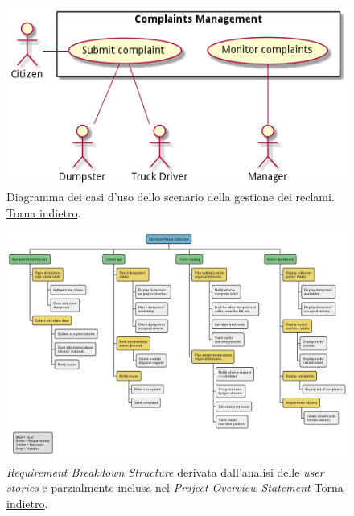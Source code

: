 \begin{figure}[H]
    \centering
    \includegraphics[width=\textwidth]{uml/complaints-use-cases.pm}
    \caption{Diagramma dei casi d'uso dello scenario della gestione dei reclami. \hyperlink{back:uml/complaints-use-cases}{Torna indietro}.}
    \label{fig:uml/complaints-use-cases}
\end{figure}


\begin{figure}[H]
    \centering
    \includegraphics[width=\textwidth]{uml/requirement-breakdown-structure.pm}
    \caption{\textit{Requirement Breakdown Structure} derivata dall'analisi delle \textit{user stories} e parzialmente inclusa nel \textit{Project Overview Statement}   \hyperlink{back:uml/requirement-breakdown-structure}{Torna indietro}.}
    \label{fig:uml/requirement-breakdown-structure}
\end{figure}


